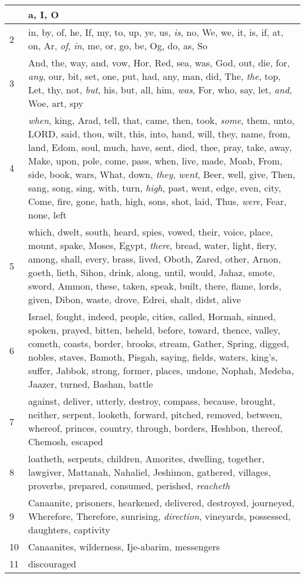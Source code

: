 \begin{longtable}{l|p{3.75in}}
\hline \hline
\endlastfoot
1 & a, I, O \\ \hline
2 & in, by, of, he, If, my, to, up, ye, us, \emph{is}, no, We, we, it, is, if, at, on, Ar, \emph{of}, \emph{in}, me, or, go, be, Og, do, as, So \\ \hline
3 & And, the, way, and, vow, Hor, Red, sea, was, God, out, die, for, \emph{any}, our, bit, set, one, put, had, any, man, did, The, \emph{the}, top, Let, thy, not, \emph{but}, his, but, all, him, \emph{was}, For, who, say, let, \emph{and}, Woe, art, spy \\ \hline
4 & \emph{when}, king, Arad, tell, that, came, then, took, \emph{some}, them, unto, LORD, said, thou, wilt, this, into, hand, will, they, name, from, land, Edom, soul, much, have, sent, died, thee, pray, take, away, Make, upon, pole, come, pass, when, live, made, Moab, From, side, book, wars, What, down, \emph{they}, \emph{went}, Beer, well, give, Then, sang, song, sing, with, turn, \emph{high}, past, went, edge, even, city, Come, fire, gone, hath, high, sons, shot, laid, Thus, \emph{were}, Fear, none, left \\ \hline
5 & which, dwelt, south, heard, spies, vowed, their, voice, place, mount, spake, Moses, Egypt, \emph{there}, bread, water, light, fiery, among, shall, every, brass, lived, Oboth, Zared, other, Arnon, goeth, lieth, Sihon, drink, along, until, would, Jahaz, smote, sword, Ammon, these, taken, speak, built, there, flame, lords, given, Dibon, waste, drove, Edrei, shalt, didst, alive \\ \hline
6 & Israel, fought, indeed, people, cities, called, Hormah, sinned, spoken, prayed, bitten, beheld, before, toward, thence, valley, cometh, coasts, border, brooks, stream, Gather, Spring, digged, nobles, staves, Bamoth, Pisgah, saying, fields, waters, king's, suffer, Jabbok, strong, former, places, undone, Nophah, Medeba, Jaazer, turned, Bashan, battle \\ \hline
7 & against, deliver, utterly, destroy, compass, because, brought, neither, serpent, looketh, forward, pitched, removed, between, whereof, princes, country, through, borders, Heshbon, thereof, Chemosh, escaped \\ \hline
8 & loatheth, serpents, children, Amorites, dwelling, together, lawgiver, Mattanah, Nahaliel, Jeshimon, gathered, villages, proverbs, prepared, consumed, perished, \emph{reacheth} \\ \hline
9 & Canaanite, prisoners, hearkened, delivered, destroyed, journeyed, Wherefore, Therefore, sunrising, \emph{direction}, vineyards, possessed, daughters, captivity \\ \hline
10 & Canaanites, wilderness, Ije-abarim, messengers \\ \hline
11 & discouraged \\ \hline
\end{longtable}






